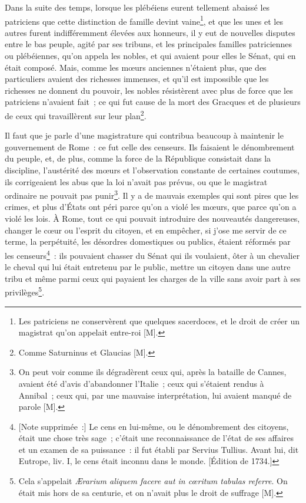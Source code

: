 \documentclass[french,twoside]{book} %
\begin{document}
Dans la suite des temps, lorsque les plébéiens eurent tellement abaissé les patriciens que cette distinction de famille devint vaine\footnote{Les patriciens ne conservèrent que quelques sacerdoces, et le droit de créer un magistrat qu’on appelait entre-roi [M].}, et que les unes et les autres furent indifféremment élevées aux honneurs, il y eut de nouvelles disputes entre le bas peuple, agité par ses tribuns, et les principales familles patriciennes ou plébéiennes, qu’on appela les nobles, et qui avaient pour elles le Sénat, qui en était composé. Mais, comme les mœurs anciennes n’étaient plus, que des particuliers avaient des richesses immenses, et qu’il est impossible que les richesses ne donnent du pouvoir, les nobles résistèrent avec plus de force que les patriciens n’avaient fait ; ce qui fut cause de la mort des Gracques et de plusieurs de ceux qui travaillèrent sur leur plan\footnote{Comme Saturninus et Glaucias [M].}.\par
Il faut que je parle d’une magistrature qui contribua beaucoup à maintenir le gouvernement de Rome : ce fut celle des censeurs. Ils faisaient le dénombrement du peuple, et, de plus, comme la force de la République consistait dans la discipline, l’austérité des mœurs et l’observation constante de certaines coutumes, ils corrigeaient les abus que la loi n’avait pas prévus, ou que le magistrat ordinaire ne pouvait pas punir\footnote{On peut voir comme ils dégradèrent ceux qui, après la bataille de Cannes, avaient été d’avis d’abandonner l’Italie ; ceux qui s’étaient rendus à Annibal ; ceux qui, par une mauvaise interprétation, lui avaient manqué de parole [M].}. Il y a de mauvais exemples qui sont pires que les crimes, et plus d’États ont péri parce qu’on a violé les mœurs, que parce qu’on a violé les lois. À Rome, tout ce qui pouvait introduire des nouveautés dangereuses, changer le cœur ou l’esprit du citoyen, et en empêcher, si j’ose me servir de ce terme, la perpétuité, les désordres domestiques ou publics, étaient réformés par les censeurs\footnote{[Note supprimée :] Le cens en lui-même, ou le dénombrement des citoyens, était une chose très sage ; c’était une reconnaissance de l’état de ses affaires et un examen de sa puissance : il fut établi par Servius Tullius. Avant lui, dit Eutrope, liv. I, le cens était inconnu dans le monde. [Édition de 1734.]} : ils pouvaient chasser du Sénat qui ils voulaient, ôter à un chevalier le cheval qui lui était entretenu par le public, mettre un citoyen dans une autre tribu et même parmi ceux qui payaient les charges de la ville sans avoir part à ses privilèges\footnote{Cela s’appelait {\itshape Ærarium aliquem facere aut in cœritum tabulas referre}. On était mis hors de sa centurie, et on n’avait plus le droit de suffrage [M].}.\par
\end{document}
